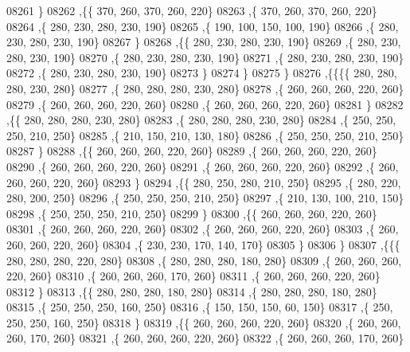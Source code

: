 \begin{DoxyCode}
08261     \}
08262    ,\{\{   370,   260,   370,   260,   220\}
08263     ,\{   370,   260,   370,   260,   220\}
08264     ,\{   280,   230,   280,   230,   190\}
08265     ,\{   190,   100,   150,   100,   190\}
08266     ,\{   280,   230,   280,   230,   190\}
08267     \}
08268    ,\{\{   280,   230,   280,   230,   190\}
08269     ,\{   280,   230,   280,   230,   190\}
08270     ,\{   280,   230,   280,   230,   190\}
08271     ,\{   280,   230,   280,   230,   190\}
08272     ,\{   280,   230,   280,   230,   190\}
08273     \}
08274    \}
08275   \}
08276  ,\{\{\{\{   280,   280,   280,   230,   280\}
08277     ,\{   280,   280,   280,   230,   280\}
08278     ,\{   260,   260,   260,   220,   260\}
08279     ,\{   260,   260,   260,   220,   260\}
08280     ,\{   260,   260,   260,   220,   260\}
08281     \}
08282    ,\{\{   280,   280,   280,   230,   280\}
08283     ,\{   280,   280,   280,   230,   280\}
08284     ,\{   250,   250,   250,   210,   250\}
08285     ,\{   210,   150,   210,   130,   180\}
08286     ,\{   250,   250,   250,   210,   250\}
08287     \}
08288    ,\{\{   260,   260,   260,   220,   260\}
08289     ,\{   260,   260,   260,   220,   260\}
08290     ,\{   260,   260,   260,   220,   260\}
08291     ,\{   260,   260,   260,   220,   260\}
08292     ,\{   260,   260,   260,   220,   260\}
08293     \}
08294    ,\{\{   280,   250,   280,   210,   250\}
08295     ,\{   280,   220,   280,   200,   250\}
08296     ,\{   250,   250,   250,   210,   250\}
08297     ,\{   210,   130,   100,   210,   150\}
08298     ,\{   250,   250,   250,   210,   250\}
08299     \}
08300    ,\{\{   260,   260,   260,   220,   260\}
08301     ,\{   260,   260,   260,   220,   260\}
08302     ,\{   260,   260,   260,   220,   260\}
08303     ,\{   260,   260,   260,   220,   260\}
08304     ,\{   230,   230,   170,   140,   170\}
08305     \}
08306    \}
08307   ,\{\{\{   280,   280,   280,   220,   280\}
08308     ,\{   280,   280,   280,   180,   280\}
08309     ,\{   260,   260,   260,   220,   260\}
08310     ,\{   260,   260,   260,   170,   260\}
08311     ,\{   260,   260,   260,   220,   260\}
08312     \}
08313    ,\{\{   280,   280,   280,   180,   280\}
08314     ,\{   280,   280,   280,   180,   280\}
08315     ,\{   250,   250,   250,   160,   250\}
08316     ,\{   150,   150,   150,    60,   150\}
08317     ,\{   250,   250,   250,   160,   250\}
08318     \}
08319    ,\{\{   260,   260,   260,   220,   260\}
08320     ,\{   260,   260,   260,   170,   260\}
08321     ,\{   260,   260,   260,   220,   260\}
08322     ,\{   260,   260,   260,   170,   260\}

\end{DoxyCode}
